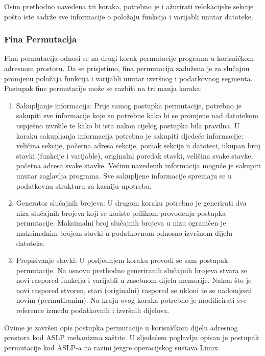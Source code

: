 \documentclass[times, utf8, diplomski, numeric]{fer}
\begin{document}
Osim prethodno navedena tri koraka, potrebno je i ažurirati
relokacijske sekcije pošto iste sadrže sve informacije o položaju
funkcija i varijabli unutar datoteke.

\subsubsection{Fina Permutacija}

Fina permutacija odnosi se na drugi korak permutacije programa u
korisničkom adresnom prostoru. Da se prisjetimo, fina permutacija
zadužena je za slučajnu promjenu položaja funkcija i varijabli
unutar izvršnog i podatkovnog segmenta. Postupak fine permutacije
može se razbiti na tri manja koraka:

\begin{enumerate}
\item Sakupljanje informacija: Prije samog postupka permutacije,
potrebno je sakupiti sve informacije koje su potrebne kako bi se
promjene nad datotekom uspješno izvršile te kako bi ista nakon
cijelog postupka bila pravilna. U koraku sakupljanja informacija
potrebno je sakupiti sljedeće informacije: veličina sekcije,
početna adresa sekcije, pomak sekcije u datoteci, ukupan broj
stavki (funkcije i varijable), originalni poredak stavki,
veličina svake stavke, početna adresa svake stavke. Većinu
navedenih informacija moguće je sakupiti unutar zaglavlja
programa. Sve sakupljene informacije spremaju se u podatkovnu
strukturu za kasniju upotrebu.

\item Generator slučajnih brojeva: U drugom koraku potrebno je
generirati dva niza slučajnih brojeva koji se koriste prilikom
provođenja postupka permutacije. Maksimalni broj slučajnih
brojeva u nizu ograničen je maksimalnim brojem stavki u
podatkovnom odnosno izvršnom dijelu datoteke.

\item Prepisivanje stavki: U posljednjem koraku provodi se sam
postupak permutacije. Na osnovu prethodno generiranih slučajnih
brojeva stvara se novi raspored funkcija i varijabli u zasebnom
dijelu memorije. Nakon što je novi raspored stvoren, stari 
(originalni) raspored se ukloni te se nadomjesti novim 
(permutiranim). Na kraju ovog koraka potrebno je modificirati sve
reference između podatkovnih i izvršnih dijelova.

\end{enumerate}

Ovime je završen opis postupka permutacije u korisničkom dijelu
adresnog prostora kod ASLP mehanizma zaštite. U sljedećem
poglavlju opisan je postupak permutacije kod ASLP-a na razini
jezgre operacijskog sustava Linux.
\end{document}
